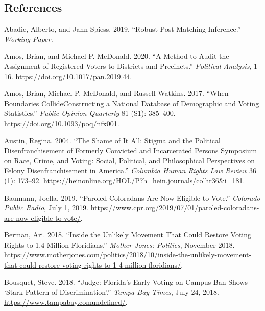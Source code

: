 \documentclass[
  12pt,
]{article}
\newlength{\cslhangindent}
\newenvironment{cslreferences}%
  {\setlength{\parindent}{0pt}%
  \everypar{\setlength{\hangindent}{\cslhangindent}}\ignorespaces}%
  {\par}
\begin{document}
\newpage

\hypertarget{references}{%
\subsection*{References}\label{references}}

\hypertarget{refs}{}
\begin{cslreferences}
\leavevmode\hypertarget{ref-Abadie2019}{}%
Abadie, Alberto, and Jann Spiess. 2019. ``Robust Post-Matching Inference.'' \emph{Working Paper.}

\leavevmode\hypertarget{ref-Amos2020}{}%
Amos, Brian, and Michael P. McDonald. 2020. ``A Method to Audit the Assignment of Registered Voters to Districts and Precincts.'' \emph{Political Analysis}, 1--16. \url{https://doi.org/10.1017/pan.2019.44}.

\leavevmode\hypertarget{ref-Amos2017}{}%
Amos, Brian, Michael P. McDonald, and Russell Watkins. 2017. ``When Boundaries CollideConstructing a National Database of Demographic and Voting Statistics.'' \emph{Public Opinion Quarterly} 81 (S1): 385--400. \url{https://doi.org/10.1093/poq/nfx001}.

\leavevmode\hypertarget{ref-Austin2004}{}%
Austin, Regina. 2004. ``The Shame of It All: Stigma and the Political Disenfranchisement of Formerly Convicted and Incarcerated Persons Symposium on Race, Crime, and Voting: Social, Political, and Philosophical Perspectives on Felony Disenfranchisement in America.'' \emph{Columbia Human Rights Law Review} 36 (1): 173--92. \url{https://heinonline.org/HOL/P?h=hein.journals/colhr36\&i=181}.

\leavevmode\hypertarget{ref-Baumann2019}{}%
Baumann, Joella. 2019. ``Paroled Coloradans Are Now Eligible to Vote.'' \emph{Colorado Public Radio}, July 1, 2019. \url{https://www.cpr.org/2019/07/01/paroled-coloradans-are-now-eligible-to-vote/}.

\leavevmode\hypertarget{ref-Berman2018}{}%
Berman, Ari. 2018. ``Inside the Unlikely Movement That Could Restore Voting Rights to 1.4 Million Floridians.'' \emph{Mother Jones: Politics}, November 2018. \url{https://www.motherjones.com/politics/2018/10/inside-the-unlikely-movement-that-could-restore-voting-rights-to-1-4-million-floridians/}.

\leavevmode\hypertarget{ref-Bousquet2018a}{}%
Bousquet, Steve. 2018. ``Judge: Florida's Early Voting-on-Campus Ban Shows `Stark Pattern of Discrimination'.'' \emph{Tampa Bay Times}, July 24, 2018. \url{https://www.tampabay.comundefined/}.


\end{cslreferences}
\end{document}
